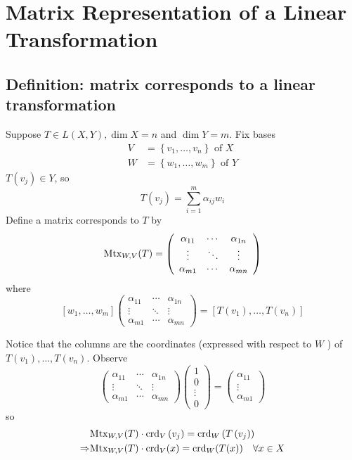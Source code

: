 \documentclass[11pt]{elegantbook}
\begin{document}
\section{Matrix Representation of a Linear Transformation}

\subsection{Definition: matrix corresponds to a linear transformation}
Suppose $T \in L(X, Y), \operatorname{dim} X=n$ and $\operatorname{dim} Y=m$. Fix bases
$$
\begin{aligned}
V & =\left\{v_1, \ldots, v_n\right\} \text { of } X \\
W & =\left\{w_1, \ldots, w_m\right\} \text { of } Y
\end{aligned}
$$
$T\left(v_j\right) \in Y$, so
$$
T\left(v_j\right)=\sum_{i=1}^m \alpha_{i j} w_i
$$
Define a matrix corresponds to $T$ by
$$
\textnormal{Mtx}_{W, V}(T)=\left(\begin{array}{ccc}
\alpha_{11} & \cdots & \alpha_{1 n} \\
\vdots & \ddots & \vdots \\
\alpha_{m 1} & \cdots & \alpha_{m n}
\end{array}\right)
$$
where $$[w_1, \ldots, w_m] \left(\begin{array}{ccc}
    \alpha_{11} & \cdots & \alpha_{1 n} \\
    \vdots & \ddots & \vdots \\
    \alpha_{m 1} & \cdots & \alpha_{m n}
    \end{array}\right)=[T(v_1),\ldots,T(v_n)]$$

Notice that the columns are the coordinates (expressed with respect to $W$ ) of $T\left(v_1\right), \ldots, T\left(v_n\right)$.
Observe
$$
\left(\begin{array}{ccc}
\alpha_{11} & \cdots & \alpha_{1 n} \\
\vdots & \ddots & \vdots \\
\alpha_{m 1} & \cdots & \alpha_{m n}
\end{array}\right)\left(\begin{array}{c}
1 \\
0 \\
\vdots \\
0
\end{array}\right)=\left(\begin{array}{c}
\alpha_{11} \\
\vdots \\
\alpha_{m 1}
\end{array}\right)
$$
so
$$
\begin{aligned}
    &\textnormal{Mtx}_{W, V}(T) \cdot \textnormal{crd}_V\left(v_j\right)  =\textnormal{crd}_W\left(T\left(v_j\right)\right) \\
    \Rightarrow &\textnormal{Mtx}_{W, V}(T) \cdot \textnormal{crd}_V(x)  =\textnormal{crd}_W(T(x)) \quad \forall x \in X
\end{aligned}
$$
\end{document}
